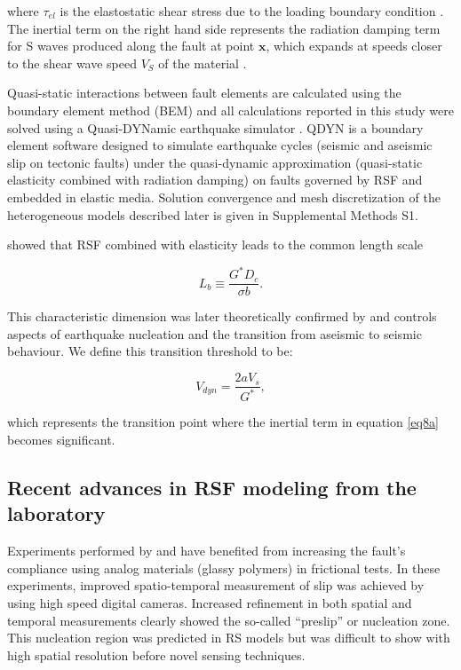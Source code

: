 \documentclass[preprint,1p, 10pt,authoryear]{elsarticle}
\begin{document}
\noindent where $\tau_{el}$ is the elastostatic shear stress due to the loading boundary condition \citep{Horowitz1989}. The inertial term on the right hand side represents the radiation damping term for S waves produced along the fault at point $\mathbf{x}$, which expands at speeds closer to the shear wave speed $V_{S}$ of the material \citep{Rice1993}. 

Quasi-static interactions between fault elements are calculated using the boundary element method (BEM) and all calculations reported in this study were solved using a Quasi-DYNamic earthquake simulator \citep{Luo2017}. QDYN is a boundary element software designed to simulate earthquake cycles (seismic and aseismic slip on tectonic faults) under the quasi-dynamic approximation (quasi-static elasticity combined with radiation damping) on faults governed by RSF and embedded in elastic media.  Solution convergence and mesh discretization of the heterogeneous models described later is given in Supplemental Methods S1.

\citet{Dieterich1992} showed that RSF combined with elasticity leads to the common length scale

\begin{equation}
\label{eq8b}
L_{b} \equiv \frac{G^{*}D_{c}}{\sigma b}.
\end{equation}  

\noindent This characteristic dimension was later theoretically confirmed by \citet{Rubin2005} and controls aspects of earthquake nucleation and the transition from aseismic to seismic behaviour. We define this transition threshold to be:

\begin{equation}
\label{eq8c}
V_{dyn} = \frac{2 a V_{s}}{G^{*}},
\end{equation}  

\noindent which represents the transition point where the inertial term in equation \eqref{eq8a} becomes significant. 

\subsection{Recent advances in RSF modeling from the laboratory}
\label{advances RSF}
Experiments performed by \citet{Nielsen2010} and \citet{Latour2013} have benefited from increasing the fault's compliance using analog materials (glassy polymers) in frictional tests. In these experiments, improved spatio-temporal measurement of slip was achieved by using high speed digital cameras. Increased refinement in both spatial and temporal measurements clearly showed the so-called ``preslip'' or nucleation zone.  This nucleation region was predicted in RS models \citep{Dieterich1992, Rubin2005, Ampuero2008} but was difficult to show with high spatial resolution before novel sensing techniques.
\end{document}
